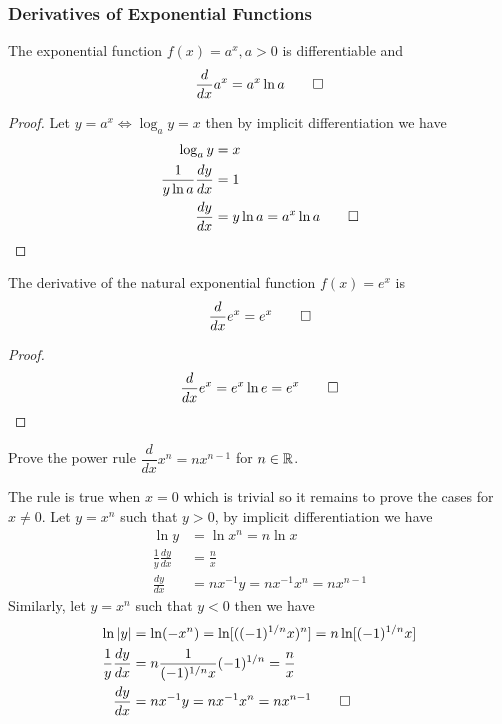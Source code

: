 \subsubsection{Derivatives of Exponential Functions}
\begin{theorem}
    The exponential function \(f(x)=a^x,a>0\) is differentiable and
    \[\frac{d}{dx}a^x=a^x\ln a\qedhere\]
\end{theorem}
\begin{proof}
    Let \(y=a^x\iff \log_a y=x\) then by implicit differentiation we have
    \begin{align*}
        \log_a y &= x \\ \frac{1}{y\ln a}\frac{dy}{dx} &= 1 \\
        \frac{dy}{dx} &= y\ln a=a^x\ln a \qedhere
    \end{align*}
\end{proof}
\begin{theorem}
    The derivative of the natural exponential function \(f(x)=e^x\) is
    \[\frac{d}{dx}e^x=e^x\qedhere\]
\end{theorem}
\begin{proof}
    \[\frac{d}{dx}e^x=e^x\ln e=e^x\qedhere\]
\end{proof}
\begin{problem}
    Prove the power rule \(\dfrac{d}{dx}x^n=nx^{n-1}\) for \(n\in\mathbb{R}\).
\end{problem}
\begin{solution}
    The rule is true when \(x=0\) which is trivial so it remains to prove the
    cases for \(x\neq 0\).
    Let \(y=x^n\) such that \(y>0\), by implicit differentiation we have
    \begin{align*}
        \ln y &= \ln x^n=n\ln x \\ \frac{1}{y}\frac{dy}{dx} &= \frac{n}{x} \\
        \frac{dy}{dx} &= nx^{-1}y=nx^{-1}x^n=nx^{n-1}
    \end{align*}
    Similarly, let \(y=x^n\) such that \(y<0\) then we have
    \begin{align*}
        \ln|y| &= \ln(-x^n)=\ln[((-1)^{1/n}x)^n]=n\ln[(-1)^{1/n}x] \\
        \frac{1}{y}\frac{dy}{dx} &= n\frac{1}{(-1)^{1/n}x}(-1)^{1/n}
        =\frac{n}{x} \\ \frac{dy}{dx} &= nx^{-1}y=nx^{-1}x^n=nx^{n-1} \qedhere
    \end{align*}
\end{solution}


